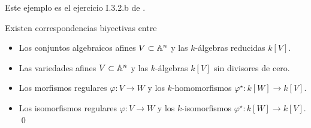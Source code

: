 \begin{remark}
Este ejemplo es el ejercicio I.3.2.b de \cite[p. 21]{hartshorne}.
\end{remark}

\begin{corollary}
Existen correspondencias biyectivas entre

\begin{itemize}
    \item Los conjuntos algebraicos afines $V \subset \mathbb A^n$ y las $k$-álgebras reducidas $k[V]$.
    \item Las variedades afines $V \subset \mathbb A^n$ y las $k$-álgebras $k[V]$ sin divisores de cero.
    \item Los morfismos regulares $\varphi : V \to W$ y los $k$-homomorfismos $\varphi^\star : k[W] \to k[V]$.
    \item Los isomorfismos regulares $\varphi : V \to W$ y los $k$-isomorfismos $\varphi^\star : k[W] \to k[V]$. \qed
\end{itemize}
\end{corollary}
